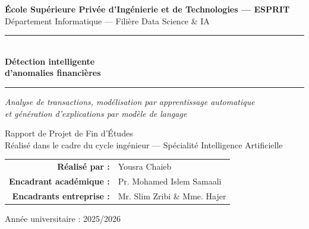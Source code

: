 \documentclass[12pt,a4paper,twoside]{report}
\begin{document}

\begin{titlepage}
\centering

\vspace{1cm}

{\large \textbf{École Supérieure Privée d'Ingénierie et de Technologies --- ESPRIT}}\\[0.3cm]
{\large Département Informatique --- Filière Data Science \& IA}

\vspace{1.5cm}

\rule{\linewidth}{0.4pt}\\[0.4cm]
{\fontsize{24}{28}\selectfont \textbf{Détection intelligente\\[0.2cm] d'anomalies financières}}\\[0.4cm]
\rule{\linewidth}{0.4pt}

\vspace{0.6cm}

{\large \textit{Analyse de transactions, modélisation par apprentissage automatique\\et génération d'explications par modèle de langage}}

\vspace{1.5cm}

{\large Rapport de Projet de Fin d'Études}\\[0.2cm]
{\normalsize Réalisé dans le cadre du cycle ingénieur --- Spécialité Intelligence Artificielle}

\vspace{1.5cm}

\begin{tabular}{rl}
  \textbf{Réalisé par :}         & Yousra Chaieb \\[0.2cm]
  \textbf{Encadrant académique :} & Pr. Mohamed Islem Samaali \\[0.2cm]
  \textbf{Encadrants entreprise :} & Mr. Slim Zribi \& Mme. Hajer \\[0.2cm]
\end{tabular}

\vfill

{\large Année universitaire : 2025/2026}

\end{titlepage}

\clearpage
{}

\end{document}

